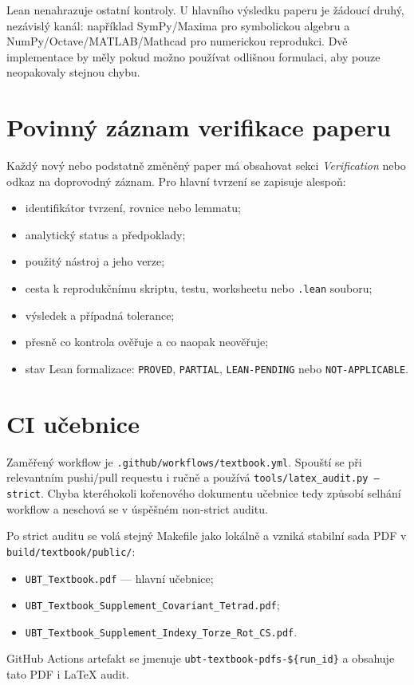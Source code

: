 Lean nenahrazuje ostatní kontroly. U hlavního výsledku paperu je žádoucí druhý,
nezávislý kanál: například SymPy/Maxima pro symbolickou algebru a
NumPy/Octave/MATLAB/Mathcad pro numerickou reprodukci. Dvě implementace by měly
pokud možno používat odlišnou formulaci, aby pouze neopakovaly stejnou chybu.

\section{Povinný záznam verifikace paperu}
Každý nový nebo podstatně změněný paper má obsahovat sekci \emph{Verification}
nebo odkaz na doprovodný záznam. Pro hlavní tvrzení se zapisuje alespoň:
\begin{itemize}
 \item identifikátor tvrzení, rovnice nebo lemmatu;
 \item analytický status a předpoklady;
 \item použitý nástroj a jeho verze;
 \item cesta k reprodukčnímu skriptu, testu, worksheetu nebo \texttt{.lean}
       souboru;
 \item výsledek a případná tolerance;
 \item přesně co kontrola ověřuje a co naopak neověřuje;
 \item stav Lean formalizace: \texttt{PROVED}, \texttt{PARTIAL},
       \texttt{LEAN-PENDING} nebo \texttt{NOT-APPLICABLE}.
\end{itemize}

\section{CI učebnice}
Zaměřený workflow je \texttt{.github/workflows/textbook.yml}. Spouští se při
relevantním pushi/pull requestu i ručně a používá
\texttt{tools/latex\_audit.py --strict}. Chyba kteréhokoli kořenového dokumentu
učebnice tedy způsobí selhání workflow a neschová se v úspěšném non-strict
auditu.

Po strict auditu se volá stejný Makefile jako lokálně a vzniká stabilní sada
PDF v \texttt{build/textbook/public/}:
\begin{itemize}
 \item \texttt{UBT\_Textbook.pdf} --- hlavní učebnice;
 \item \texttt{UBT\_Textbook\_Supplement\_Covariant\_Tetrad.pdf};
 \item \texttt{UBT\_Textbook\_Supplement\_Indexy\_Torze\_Rot\_CS.pdf}.
\end{itemize}
GitHub Actions artefakt se jmenuje
\texttt{ubt-textbook-pdfs-\$\{run\_id\}} a obsahuje tato PDF i LaTeX audit.

